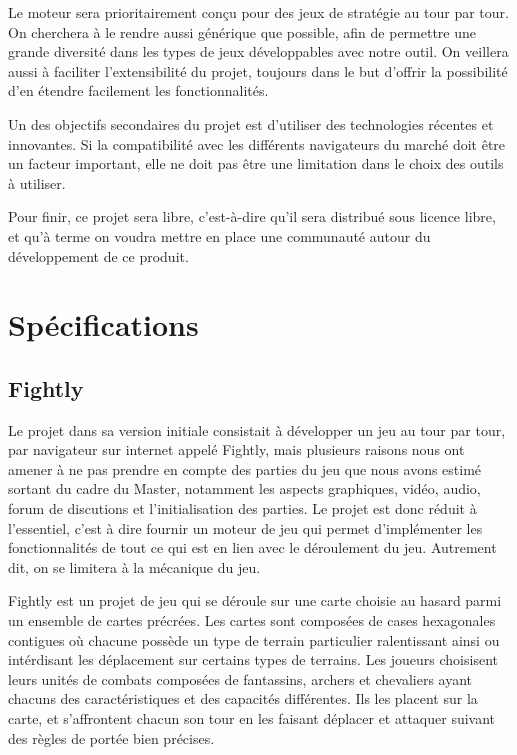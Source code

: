 \documentclass[a4paper,10pt]{report}
\begin{document}
Le moteur sera prioritairement conçu pour des jeux de stratégie au tour par tour. On cherchera à le rendre aussi générique que possible, afin de permettre une grande diversité dans les types de jeux développables avec notre outil. On veillera aussi à faciliter l'extensibilité du projet, toujours dans le but d'offrir la possibilité d'en étendre facilement les fonctionnalités.

Un des objectifs secondaires du projet est d'utiliser des technologies récentes et innovantes. Si la compatibilité avec les différents navigateurs du marché doit être un facteur important, elle ne doit pas être une limitation dans le choix des outils à utiliser. 

Pour finir, ce projet sera libre, c'est-à-dire qu'il sera distribué sous licence libre, et qu'à terme on voudra mettre en place une communauté autour du développement de ce produit. 

\section{Spécifications}

\subsection{Fightly}

Le projet dans sa version initiale consistait à développer un jeu au tour par tour, par navigateur sur internet appelé Fightly, mais plusieurs raisons nous ont amener à ne pas prendre en compte des parties du jeu que nous avons estimé sortant du cadre du Master, notamment les aspects graphiques, vidéo, audio, forum de discutions et l'initialisation des parties. Le projet est donc réduit à l'essentiel, c'est à dire fournir un moteur de jeu qui permet d'implémenter les fonctionnalités de tout ce qui est en lien avec le déroulement du jeu. Autrement dit, on se limitera à la mécanique du jeu.

Fightly est un projet de jeu qui se déroule sur une carte choisie au hasard parmi un ensemble de cartes précrées. Les cartes sont composées de cases hexagonales contigues où chacune possède un type de terrain particulier ralentissant ainsi ou intérdisant les déplacement sur certains types de terrains. Les joueurs choisisent leurs unités de combats composées de fantassins, archers et chevaliers ayant chacuns des caractéristiques et des capacités différentes. Ils les placent sur la carte, et s'affrontent chacun son tour en les faisant déplacer et attaquer suivant des règles de portée bien précises.
\end{document}

